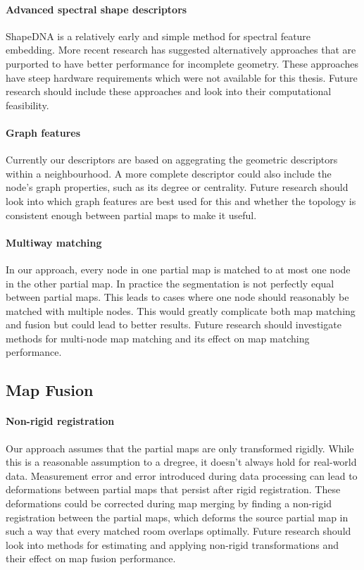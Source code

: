 \paragraph{Advanced spectral shape descriptors}
ShapeDNA is a relatively early and simple method for spectral feature embedding. More recent research has suggested alternatively approaches that are purported to have better performance for incomplete geometry. These approaches have steep hardware requirements which were not available for this thesis. Future research should include these approaches and look into their computational feasibility.

\paragraph{Graph features}
Currently our descriptors are based on aggegrating the geometric descriptors within a neighbourhood. A more complete descriptor could also include the node's graph properties, such as its degree or centrality. Future research should look into which graph features are best used for this and whether the topology is consistent enough between partial maps to make it useful.

\paragraph{Multiway matching}
In our approach, every node in one partial map is matched to at most one node in the other partial map. In practice the segmentation is not perfectly equal between partial maps. This leads to cases where one node should reasonably be matched with multiple nodes. This would greatly complicate both map matching and fusion but could lead to better results. Future research should investigate methods for multi-node map matching and its effect on map matching performance.

\subsection{Map Fusion}

\paragraph{Non-rigid registration}
Our approach assumes that the partial maps are only transformed rigidly. While this is a reasonable assumption to a dregree, it doesn't always hold for real-world data. Measurement error and error introduced during data processing can lead to deformations between partial maps that persist after rigid registration. These deformations could be corrected during map merging by finding a non-rigid registration between the partial maps, which deforms the source partial map in such a way that every matched room overlaps optimally. Future research should look into methods for estimating and applying non-rigid transformations and their effect on map fusion performance.

